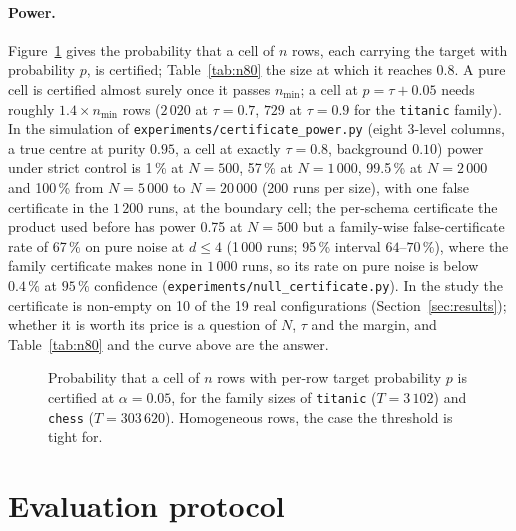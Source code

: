 \documentclass[11pt]{article}
\begin{document}
\paragraph{Power.} Figure~\ref{fig:power} gives the probability that a cell of $n$ rows, each carrying the target with probability $p$, is certified; Table~\ref{tab:n80} the size at which it reaches $0.8$. A pure cell is certified almost surely once it passes $n_{\min}$; a cell at $p=\tau+0.05$ needs roughly $1.4\times n_{\min}$ rows ($2\,020$ at $\tau=0.7$, $729$ at $\tau=0.9$ for the \texttt{titanic} family). In the simulation of \texttt{experiments/certificate\_power.py} (eight 3-level columns, a true centre at purity $0.95$, a cell at exactly $\tau=0.8$, background $0.10$) power under strict control is 1\,\% at $N=500$, 57\,\% at $N=1\,000$, 99.5\,\% at $N=2\,000$ and 100\,\% from $N=5\,000$ to $N=20\,000$ (200 runs per size), with one false certificate in the $1\,200$ runs, at the boundary cell; the per-schema certificate the product used before has power 0.75 at $N=500$ but a family-wise false-certificate rate of 67\,\% on pure noise at $d\le4$ (1\,000 runs; 95\,\% interval $64$--$70\,\%$), where the family certificate makes none in $1\,000$ runs, so its rate on pure noise is below $0.4\,\%$ at $95\,\%$ confidence (\texttt{experiments/null\_certificate.py}). In the study the certificate is non-empty on 10 of the 19 real configurations (Section~\ref{sec:results}); whether it is worth its price is a question of $N$, $\tau$ and the margin, and Table~\ref{tab:n80} and the curve above are the answer.

\begin{figure}[t]\centering

\caption{Probability that a cell of $n$ rows with per-row target probability $p$ is certified at $\alpha=0.05$, for the family sizes of \texttt{titanic} ($T=3\,102$) and \texttt{chess} ($T=303\,620$). Homogeneous rows, the case the threshold is tight for.}\label{fig:power}
\end{figure}

\begin{table}[t]\centering\small
\caption{$n_{80}$: the cell size at which the probability of certification reaches $0.8$, next to $n_{\min}$ (Table~\ref{tab:nmin}).}\label{tab:n80}

\end{table}

\section{Evaluation protocol}\label{sec:protocol}
\end{document}

